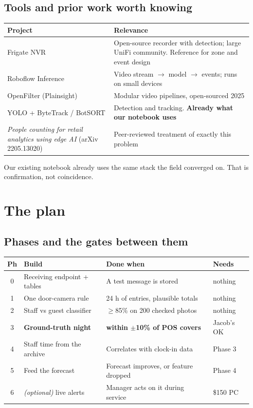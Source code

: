 \documentclass[11pt,a4paper]{article}
\begin{document}
\subsection{Tools and prior work worth knowing}

\begin{center}
\begin{tabular}{@{}lp{9.2cm}@{}}
\toprule
\textbf{Project} & \textbf{Relevance} \\
\midrule
Frigate NVR & Open-source recorder with detection; large UniFi community.
Reference for zone and event design \\
Roboflow Inference & Video stream $\rightarrow$ model $\rightarrow$ events;
runs on small devices \\
OpenFilter (Plainsight) & Modular video pipelines, open-sourced 2025 \\
YOLO + ByteTrack / BotSORT & Detection and tracking. \textbf{Already what
our notebook uses} \\
\emph{People counting for retail analytics using edge AI} (arXiv 2205.13020)
& Peer-reviewed treatment of exactly this problem \\
\bottomrule
\end{tabular}
\end{center}

Our existing notebook already uses the same stack the field converged on.
That is confirmation, not coincidence.

\section{The plan}

\subsection{Phases and the gates between them}

\begin{center}
\begin{tabular}{@{}clp{6.0cm}p{3.8cm}@{}}
\toprule
\textbf{Ph} & \textbf{Build} & \textbf{Done when} & \textbf{Needs} \\
\midrule
0 & Receiving endpoint + tables & A test message is stored & nothing \\
1 & One door-camera rule & 24 h of entries, plausible totals & nothing \\
2 & Staff vs guest classifier & $\geq$85\% on 200 checked photos & nothing \\
3 & \textbf{Ground-truth night} & \textbf{within $\pm$10\% of POS covers} & Jacob's OK \\
4 & Staff time from the archive & Correlates with clock-in data & Phase 3 \\
5 & Feed the forecast & Forecast improves, or feature dropped & Phase 4 \\
6 & \emph{(optional)} live alerts & Manager acts on it during service & \$150 PC \\
\bottomrule
\end{tabular}
\end{center}
\end{document}
